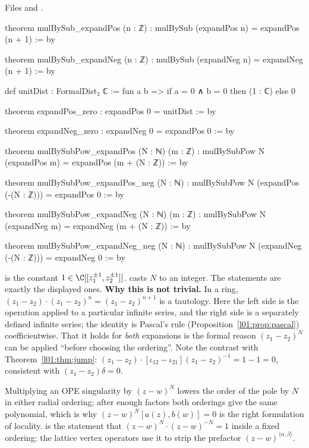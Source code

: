\noindent Files  and
.
\begin{leancode}
theorem mulBySub_expandPos (n : ℤ) : mulBySub (expandPos n) = expandPos (n + 1) := by

theorem mulBySub_expandNeg (n : ℤ) : mulBySub (expandNeg n) = expandNeg (n + 1) := by

def unitDist : FormalDist₂ ℂ := fun a b => if a = 0 ∧ b = 0 then (1 : ℂ) else 0

theorem expandPos_zero : expandPos 0 = unitDist := by

theorem expandNeg_zero : expandNeg 0 = expandPos 0 := by

theorem mulBySubPow_expandPos (N : ℕ) (m : ℤ) :
    mulBySubPow N (expandPos m) = expandPos (m + (N : ℤ)) := by

theorem mulBySubPow_expandPos_neg (N : ℕ) :
    mulBySubPow N (expandPos (-(N : ℤ))) = expandPos 0 := by

theorem mulBySubPow_expandNeg (N : ℕ) (m : ℤ) :
    mulBySubPow N (expandNeg m) = expandNeg (m + (N : ℤ)) := by

theorem mulBySubPow_expandNeg_neg (N : ℕ) :
    mulBySubPow N (expandNeg (-(N : ℤ))) = expandNeg 0 := by
\end{leancode}

\begin{dictionary}
 is the constant $1\in\C[[z_1^{\pm1},z_2^{\pm1}]]$.  casts $N$ to an integer. The
statements are exactly the displayed ones. \textbf{Why this is not trivial.} In a ring, $(z_1-z_2)\cdot
(z_1-z_2)^n = (z_1-z_2)^{n+1}$ is a tautology. Here the left side is the operation  applied to a
particular infinite series, and the right side is a separately defined infinite series; the identity is
Pascal's rule (Proposition~\ref{l01:prop:pascal}) coefficientwise. That it holds for \emph{both} expansions is
the formal reason $(z_1-z_2)^N$ can be applied ``before choosing the ordering''. Note the contrast with
Theorem~\ref{l01:thm:jump}: $(z_1-z_2)\cdot[\iota_{12}-\iota_{21}](z_1-z_2)^{-1} = 1-1 = 0$, consistent with
$(z_1-z_2)\delta = 0$.
\end{dictionary}

\begin{physics}
Multiplying an OPE singularity by $(z-w)^N$ lowers the order of the pole by $N$ in either radial ordering;
after enough factors both orderings give the same polynomial, which is why $(z-w)^N[a(z),b(w)] = 0$ is the
right formulation of locality.  is the statement that
$(z-w)^N\cdot(z-w)^{-N} = 1$ inside a fixed ordering; the lattice vertex operators use it to strip the
prefactor $(z-w)^{\langle\alpha,\beta\rangle}$.
\end{physics}

